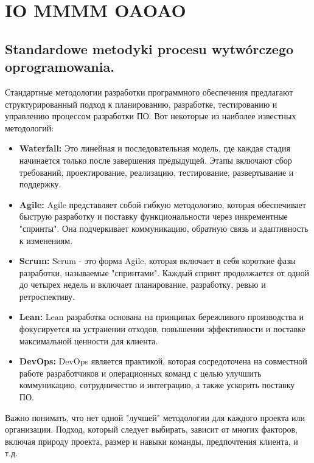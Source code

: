 \chapter{IO MMMM OAOAO}
\section{Standardowe metodyki procesu wytwórczego oprogramowania.}

Стандартные методологии разработки программного обеспечения предлагают структурированный подход к планированию, разработке, тестированию и управлению процессом разработки ПО. Вот некоторые из наиболее известных методологий:

\begin{itemize}
\item \textbf{Waterfall:} Это линейная и последовательная модель, где каждая стадия начинается только после завершения предыдущей. Этапы включают сбор требований, проектирование, реализацию, тестирование, развертывание и поддержку.

\item \textbf{Agile:} Agile представляет собой гибкую методологию, которая обеспечивает быструю разработку и поставку функциональности через инкрементные "спринты". Она подчеркивает коммуникацию, обратную связь и адаптивность к изменениям.

\item \textbf{Scrum:} Scrum - это форма Agile, которая включает в себя короткие фазы разработки, называемые "спринтами". Каждый спринт продолжается от одной до четырех недель и включает планирование, разработку, ревью и ретроспективу.

\item \textbf{Lean:} Lean разработка основана на принципах бережливого производства и фокусируется на устранении отходов, повышении эффективности и поставке максимальной ценности для клиента.

\item \textbf{DevOps:} DevOps является практикой, которая сосредоточена на совместной работе разработчиков и операционных команд с целью улучшить коммуникацию, сотрудничество и интеграцию, а также ускорить поставку ПО.
\end{itemize}

Важно понимать, что нет одной "лучшей" методологии для каждого проекта или организации. Подход, который следует выбирать, зависит от многих факторов, включая природу проекта, размер и навыки команды, предпочтения клиента, и т.д.

